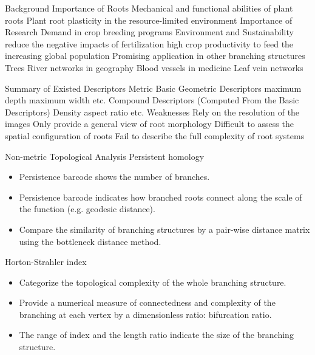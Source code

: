 \documentclass{article}
\begin{document}
\begin{outline}[enumerate]

   \1 Background
     \2 Importance of Roots
       \3 Mechanical and functional abilities of plant roots
       \3 Plant root plasticity in the resource-limited environment
     \2 Importance of Research
       \3 Demand in crop breeding programs
       \3 Environment and Sustainability
         \4 reduce the negative impacts of fertilization
         \4 high crop productivity to feed the increasing global population
       \3 Promising application in other branching structures
         \4 Trees
         \4 River networks in geography
         \4 Blood vessels in medicine
         \4 Leaf vein networks

  \1 Summary of Existed Descriptors
    \2 Metric
      \3 Basic Geometric Descriptors
        \4 maximum depth
        \4 maximum width
        \4 etc.
      \3 Compound Descriptors (Computed From the Basic Descriptors)
        \4 Density
        \4 aspect ratio
        \4 etc.
      \3 Weaknesses
        \4 Rely on the resolution of the images \cite{balduzzi2017reshaping}
        \4 Only provide a general view of root morphology \cite{balduzzi2017reshaping}
        \4 Difficult to assess the spatial configuration of roots
        \4 Fail to describe the full complexity of root systems

    \2 Non-metric
      \3 Topological Analysis
        \4 Persistent homology \cite{li2017persistent}
          \begin{itemize}
            \item Persistence barcode shows the number of branches.
            \item Persistence barcode indicates how branched roots connect along the scale of the function (e.g. geodesic distance).
            \item Compare the similarity of branching structures by a pair-wise distance matrix using the bottleneck distance method.
          \end{itemize}
          
       \4 Horton-Strahler index \cite{toroczkai2001topological}
         \begin{itemize}
            \item Categorize the topological complexity of the whole branching structure.
            \item Provide a numerical measure of connectedness and complexity of the branching at each vertex by a dimensionless ratio: bifurcation ratio.
            \item The range of index and the length ratio indicate the size of the branching structure.
         \end{itemize}
                

\end{outline}
\end{document}
